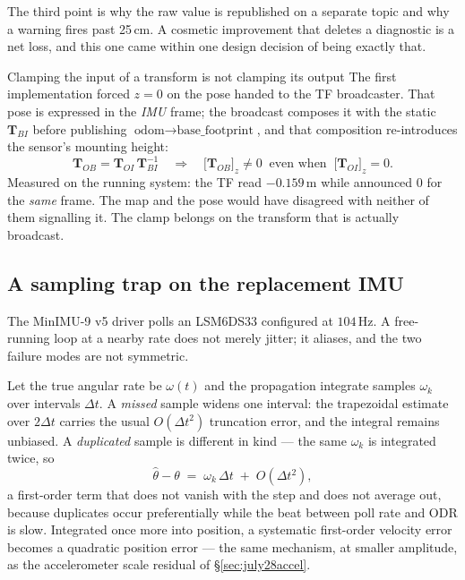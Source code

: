 The third point is why the raw value is republished on a separate topic and
why a warning fires past 25\,cm. A cosmetic improvement that deletes a
diagnostic is a net loss, and this one came within one design decision of
being exactly that.

\begin{trapbox}{Clamping the input of a transform is not clamping its output}
The first implementation forced $z=0$ on the pose handed to the TF
broadcaster. That pose is expressed in the \emph{IMU} frame; the broadcast
composes it with the static $\mathbf{T}_{B\!I}$ before publishing
$\text{odom} \rightarrow \text{base\_footprint}$, and that composition
re-introduces the sensor's mounting height:
\[
  \mathbf{T}_{OB} = \mathbf{T}_{OI}\,\mathbf{T}_{B\!I}^{-1}
  \quad\Longrightarrow\quad
  \bigl[\mathbf{T}_{OB}\bigr]_{z} \neq 0
  \ \text{ even when }\ \bigl[\mathbf{T}_{OI}\bigr]_{z} = 0 .
\]
Measured on the running system: the TF read $-0.159$\,m while
 announced $0$ for the \emph{same} frame. The map
and the pose would have disagreed with neither of them signalling it. The
clamp belongs on the transform that is actually broadcast.
\end{trapbox}

\subsection{A sampling trap on the replacement IMU}
\label{sec:dupsample}

The MinIMU-9 v5 driver polls an LSM6DS33 configured at $104$\,Hz. A
free-running loop at a nearby rate does not merely jitter; it aliases, and
the two failure modes are not symmetric.

Let the true angular rate be $\omega(t)$ and the propagation integrate
samples $\omega_k$ over intervals $\Delta t$. A \emph{missed} sample widens
one interval: the trapezoidal estimate over $2\Delta t$ carries the usual
$O(\Delta t^2)$ truncation error, and the integral remains unbiased. A
\emph{duplicated} sample is different in kind --- the same $\omega_k$ is
integrated twice, so
\begin{equation}
\widehat{\theta} - \theta
  \;=\; \omega_k\,\Delta t \;+\; O(\Delta t^2),
\label{eq:dupbias}
\end{equation}
a first-order term that does not vanish with the step and does not average
out, because duplicates occur preferentially while the beat between poll
rate and ODR is slow. Integrated once more into position, a systematic
first-order velocity error becomes a quadratic position error --- the same
mechanism, at smaller amplitude, as the accelerometer scale residual of
\S\ref{sec:july28accel}.

